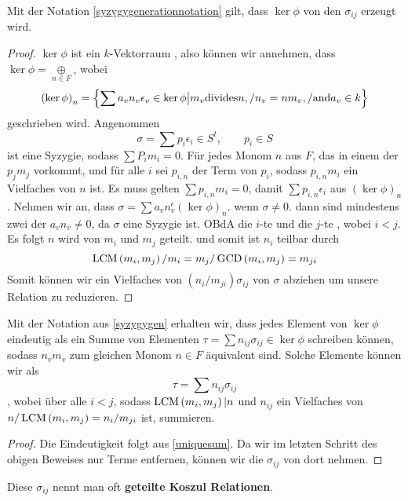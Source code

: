 \documentclass{article}
\begin{document}
\begin{lem}
	Mit der Notation  \ref{syzygygenerationnotation} gilt,
	dass 
	\( \ker \phi \)
	von den
	\( \sigma_{ij} \)
	erzeugt wird.
	\begin{proof}
		\label{uniquesum}
		\( \ker \phi\)
		ist ein 
		\( k \)-Vektorraum ,
		also k\"onnen wir annehmen, dass 
		\( \ker \phi = \underset{n \in F }{\oplus} \),
		wobei
		\[ 
			\left( \ker \phi \right)_{n} 
			= \left\{ 
				\sum a_{v} n_{v} \epsilon_{v} \in \ker \phi 
				\big| m_{v} \text{divides} n, 
				/ n_{v} = n \/ m_{v}, 
				/ \text{and} a_{v} \in k  
			\right\}
		\]
		geschrieben wird.
		Angenommen
		\[
			\sigma = \sum p_{i} \epsilon_{i} \in S^{t}, \qquad p_{i} \in S
		\]
		ist eine Syzygie,
		sodass
		\( \sum P_{i}m_{i} =0 \).
		F\"ur jedes Monom 
		\( n \)
		aus 
		\(F\),
		das in einem der 
		\( p_{j}m_{j} \)
		vorkommt,
		und f\"ur alle 
		\(i\) 
		sei 
		\( p_{i,n}\)
		der Term von
		\( p_{i} \),
		sodass 
		\( p_{i,n}m_{i} \)
		ein Vielfaches von 
		\( n\)
		ist.
		Es muss gelten
		\( \sum p_{i,n} m_{i}=0 \),
		damit 
		\( \sum p_{i,n} \epsilon_{i} \)
		aus 
		\( \left( \ker \phi \right)_{n}\).
		Nehmen wir an, dass 
		\( \sigma= \sum a_{v} n_{v}^{\epsilon} 
		\left( \ker \phi \right)_{n} \).
		wenn 
		\( \sigma \neq 0 \).
		dann sind mindestens zwei der 
		\( a_{v} n_{v} \neq 0 \),
		da 
		\( \sigma \) eine Syzygie ist.
		OBdA die 
		\(i\)-te 
		und die
		\(j\)-te
		, wobei 
		\( i<j \).
		Es folgt 
		\( n \) 
		wird von
		\( m_{i} \)
		und 
		\( m_{j} \) 
		geteilt.
		und somit ist 
		\( n_{i} \)
		teilbar durch
		\[
			\operatorname{LCM}\left( m_{i},m_{j} \right)/m_{i} 
			= m_{j} / \operatorname{GCD}\left( m_{i},m_{j} \right) 
			= m_{ji} 
		\]
		Somit k\"onnen wir ein Vielfaches von 
		\( \left( n_{i}/m_{ji} \right)\sigma_{ij} \)
		von 
		\( \sigma \) 
		abziehen um unsere Relation zu reduzieren.
	\end{proof}
\end{lem}
\begin{lem}
	Mit der Notation aus \ref{syzygygen} erhalten wir,
	dass jedes Element von 
	\( \ker \phi \)
	eindeutig als ein Summe von Elementen 
	\( \tau = \sum n_{ij} \sigma_{ij} \in \ker \phi\)
	schreiben k\"onnen, 
	sodass 
	\( n_{v} m_{v} \)
	zum gleichen Monom 
	\( n\in F \)
	\"aquivalent sind.
	Solche Elemente k\"onnen wir als
	\[ 
		\tau = \sum n_{ij} \sigma_{ij} 
	\],
	wobei \"uber alle 
	\( i<j \), 
	sodass 
	\( \operatorname{LCM} \left( m_{i},m_{j} \right)  | n \)
	und
	\( n_{ij} \)
	ein Vielfaches von 
	\( n/ \operatorname{LCM}\left( m_{i},m_{j} \right)
	=n_{i} / m_{ji}\)
	ist,
	summieren.
	\begin{proof}
		Die Eindeutigkeit folgt aus \ref{uniquesum}.
		Da wir im letzten Schritt des obigen Beweises nur Terme entfernen,
		k\"onnen wir die 
		\(\sigma_{ij} \) 
		von dort nehmen.
	\end{proof}
\end{lem}
Diese 
\( \sigma_{ij}\)
nennt man oft 
\textbf{geteilte Koszul Relationen}.



\end{document}
